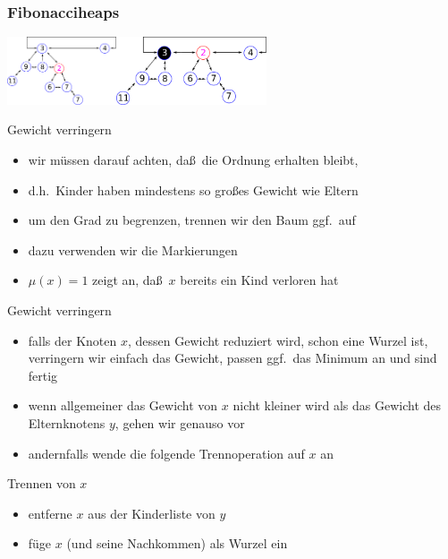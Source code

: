 \documentclass[aspectratio=1610, 11pt]{beamer}
\newcommand{\mytitle}{Fibonacciheaps}
\begin{document}
\begin{frame}\frametitle{\mytitle}
		\includegraphics[height=20mm]{images/fibo9.pdf}\hfill \includegraphics[height=20mm]{images/fibo10.pdf}
	\begin{overprint}
		\begin{exampleblock}{Gewicht verringern}
			\begin{itemize}
				\item wir m\"ussen darauf achten, da\ss\ die Ordnung erhalten bleibt,
				\item d.h.\ Kinder haben mindestens so gro\ss es Gewicht wie Eltern
				\item um den Grad zu begrenzen, trennen wir den Baum ggf.\ auf
				\item dazu verwenden wir die Markierungen
				\item $\mu(x)=1$ zeigt an, da\ss\ $x$ bereits ein Kind verloren hat
			\end{itemize}
		\end{exampleblock}	
		\begin{exampleblock}{Gewicht verringern}
			\begin{itemize}
				\item falls der Knoten $x$, dessen Gewicht reduziert wird, schon eine Wurzel ist, verringern wir einfach das Gewicht, passen ggf.\ das Minimum an und sind fertig
				\item wenn allgemeiner das Gewicht von $x$ nicht kleiner wird als das Gewicht des Elternknotens $y$, gehen wir genauso vor
				\item andernfalls wende die folgende Trennoperation auf $x$ an
			\end{itemize}
		\end{exampleblock}	
		\begin{exampleblock}{Trennen von $x$}
			\begin{itemize}
				\item entferne $x$ aus der Kinderliste von $y$
				\item f\"uge $x$ (und seine Nachkommen) als Wurzel ein

\end{itemize}
\end{exampleblock}
\end{overprint}
\end{frame}
\end{document}
